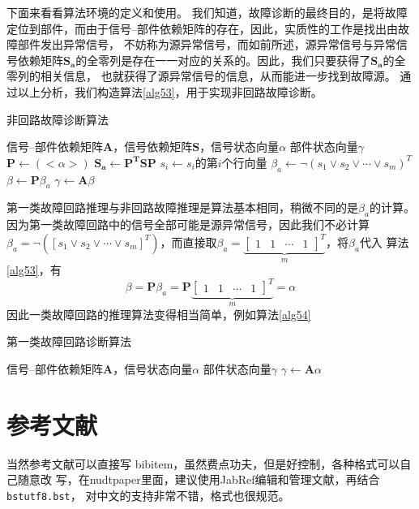 {下面来看看算法环境的定义和使用。
我们知道，故障诊断的最终目的，是将故障定位到部件，而由于信号--部件依赖矩阵的存在，因此，实质性的工作是找出由故障部件发出异常信号，
不妨称为源异常信号，而如前所述，源异常信号与异常信号依赖矩阵$\mathbf{S_a}$的全零列是存在一一对应的关系的。因此，我们只要获得了$\mathbf{S_a}$的全零列的相关信息，
也就获得了源异常信号的信息，从而能进一步找到故障源。
通过以上分析，我们构造算法\ref{alg53}，用于实现非回路故障诊断。
\begin{algorithm}[htbp]
  \caption{非回路故障诊断算法}
  \label{alg53}
  \begin{algorithmic}[1]
    \REQUIRE 信号--部件依赖矩阵$\mathbf{A}$，信号依赖矩阵$\mathbf{S}$，信号状态向量$\alpha$
    \ENSURE 部件状态向量$\gamma$
    \STATE $\mathbf{P}\leftarrow\left(<\alpha>\right)$
    \STATE $\mathbf{S_{a}}\leftarrow\mathbf{P^T}\mathbf{S}\mathbf{P}$
    \STATE $s_i\leftarrow s_i$的第$i$个行向量
    \ENDFOR
    \STATE $\beta_a\leftarrow\lnot \left(s_1\lor s_2\lor \cdots\lor s_m\right)^T$
    \STATE $\beta\leftarrow\mathbf{P}\beta_a$
    \STATE $\gamma\leftarrow\mathbf{A}\beta$
  \end{algorithmic}
\end{algorithm}

第一类故障回路推理与非回路故障推理是算法基本相同，稍微不同的是$\beta_a$的计算。因为第一类故障回路中的信号全部可能是源异常信号，因此我们不必计算
$\beta_a=\lnot \left(\left[s_1\lor s_2\lor \cdots\lor s_m\right]^T\right)$，而直接取$\beta_a=\underbrace{\left[\begin{array}{cccc}1&1&\cdots&1\end{array}\right]^T}_m$，将$\beta_a$代入
算法\ref{alg53}，有
\[\beta=\mathbf{P}\beta_a=\mathbf{P}\underbrace{\left[\begin{array}{cccc}1&1&\cdots&1\end{array}\right]^T}_m=\alpha\]
因此一类故障回路的推理算法变得相当简单，例如算法\ref{alg54}
\begin{algorithm}[htbp]
  \caption{第一类故障回路诊断算法}
  \label{alg54}
  \begin{algorithmic}[1]
    \REQUIRE 信号--部件依赖矩阵$\mathbf{A}$，信号状态向量$\alpha$
    \ENSURE 部件状态向量$\gamma$
    \STATE $\gamma\leftarrow\mathbf{A}\alpha$
  \end{algorithmic}
\end{algorithm}

\section{参考文献}
\label{sec:bib}
当然参考文献可以直接写 bibitem，虽然费点功夫，但是好控制，各种格式可以自己随意改
写，在nudtpaper里面，建议使用JabRef编辑和管理文献，再结合\verb|bstutf8.bst|，
对中文的支持非常不错，格式也很规范。

}
